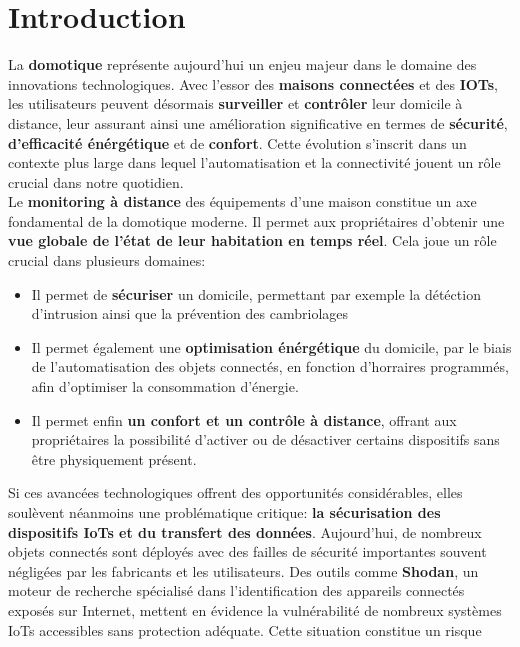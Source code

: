 \documentclass[10pt, a4paper]{report}
\begin{document}
	\chapter{Introduction}
		La \textbf{domotique} représente aujourd'hui un enjeu majeur dans le domaine des innovations technologiques. Avec l'essor des 
		\textbf{maisons connectées} et des \textbf{IOTs}, les utilisateurs peuvent désormais \textbf{surveiller} et \textbf{contrôler} 
		leur domicile à distance, leur assurant ainsi une amélioration significative en termes de \textbf{sécurité}, 
		\textbf{d'efficacité énérgétique} et de \textbf{confort}. Cette évolution s'inscrit dans un contexte plus large dans lequel 
		l'automatisation et la connectivité jouent un rôle crucial dans notre quotidien.\\
		Le \textbf{monitoring à distance} des équipements d'une maison constitue un axe fondamental de la domotique moderne. Il permet 
		aux propriétaires d'obtenir une \textbf{vue globale de l'état de leur habitation en temps réel}. Cela joue un rôle crucial dans 
		plusieurs domaines:\\
		\begin{itemize}
			\item Il permet de \textbf{sécuriser} un domicile, permettant par exemple la détéction d'intrusion ainsi que la prévention 
			des cambriolages
			
			\item Il permet également une \textbf{optimisation énérgétique} du domicile, par le biais de l'automatisation des objets 
			connectés, en fonction d'horraires programmés, afin d'optimiser la consommation d'énergie.
			
			\item Il permet enfin \textbf{un confort et un contrôle à distance}, offrant aux propriétaires la possibilité d'activer ou 
			de désactiver certains dispositifs sans être physiquement présent.
		\end{itemize}
		Si ces avancées technologiques offrent des opportunités considérables, elles soulèvent néanmoins une problématique critique: 
		\textbf{la sécurisation des dispositifs IoTs et du transfert des données}. Aujourd'hui, de nombreux objets connectés sont 
		déployés avec des failles de sécurité importantes souvent négligées par les fabricants et les utilisateurs. Des outils comme 
		\textbf{Shodan}, un moteur de recherche spécialisé dans l'identification des appareils connectés exposés sur Internet, mettent 
		en évidence la vulnérabilité de nombreux systèmes IoTs accessibles sans protection adéquate. Cette situation constitue un risque 
\end{document}
